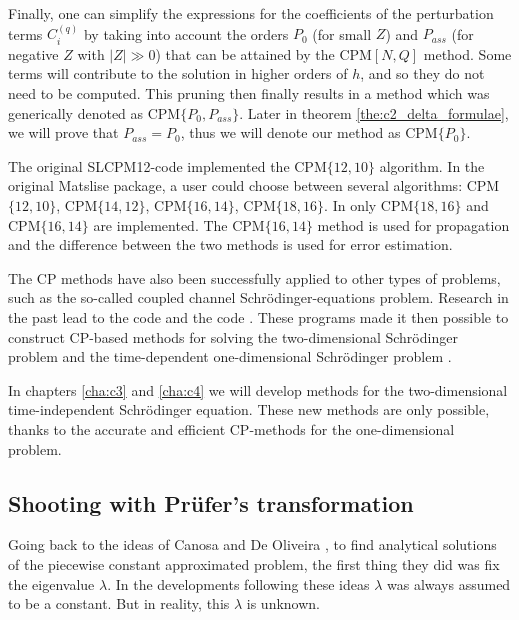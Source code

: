 Finally, one can simplify the expressions for the coefficients of the perturbation terms $C^{(q)}_i$ by taking into account the orders $P_0$ (for small $Z$) and $P_{ass}$ (for negative $Z$ with $|Z| \gg 0$) that can be attained by the CPM$[N,Q]$ method. Some terms will contribute to the solution in higher orders of $h$, and so they do not need to be computed. This pruning then finally results in a method which was generically denoted as CPM$\{P_0, P_{ass}\}$. Later in theorem \ref{the:c2_delta_formulae}, we will prove that $P_{ass} = P_0$, thus we will denote our method as CPM$\{P_0\}$.

The original SLCPM12-code implemented the CPM$\{12,10\}$ algorithm. In the original Matslise package, a user could choose between several algorithms: CPM$\{12,10\}$, CPM$\{14,12\}$, CPM$\{16,14\}$, CPM$\{18,16\}$.
In  only CPM$\{18,16\}$ and CPM$\{16,14\}$ are implemented. The CPM$\{16,14\}$ method is used for propagation and the difference between the two methods is used for error estimation.

The CP methods have also been successfully applied to other types of problems, such as the so-called coupled channel Schrödinger-equations problem. Research in the past lead to the \fortran{} code \lilix{} \cite{ixaru_lilix_2002} and the \matlab{} code \matscs{} \cite{ledoux_numerical_2007}. These programs made it then possible to construct CP-based methods for solving the two-dimensional Schrödinger problem \cite{ixaru_new_2010} and the time-dependent one-dimensional Schrödinger problem \cite{ledoux_accurate_2014}.

In chapters \ref{cha:c3} and \ref{cha:c4} we will develop methods for the two-dimensional time-independent Schrödinger equation. These new methods are only possible, thanks to the accurate and efficient CP-methods for the one-dimensional problem.

\subsection{Shooting with Prüfer's transformation}\label{sec:c2_shooting_prufer}

Going back to the ideas of Canosa and De Oliveira \cite{canosa_new_1970}, to find analytical solutions of the piecewise constant approximated problem, the first thing they did was fix the eigenvalue $\lambda$. In the developments following these ideas $\lambda$ was always assumed to be a constant. But in reality, this $\lambda$ is unknown.

